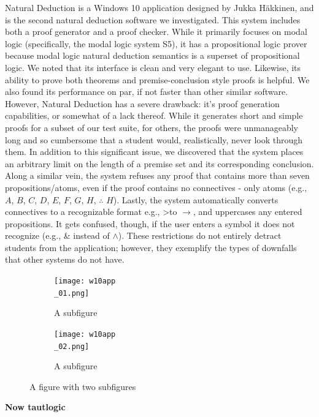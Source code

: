 \documentclass[ms]{uncgdissertationexp2}
\theoremstyle{plain}
\theoremstyle{definition}
\theoremstyle{remark}
\begin{document}
    Natural Deduction is a Windows 10 application designed by Jukka H\"akkinen, and is the second natural deduction software we investigated. This system includes both a proof generator and a proof checker. While it primarily focuses on modal logic (specifically, the modal logic system S5), it has a propositional logic prover because modal logic natural deduction semantics is a superset of propositional logic. We noted that its interface is clean and very elegant to use. Likewise, its ability to prove both theorems and premise-conclusion style proofs is helpful. We also found its performance on par, if not faster than other similar software. However, Natural Deduction has a severe drawback: it's proof generation capabilities, or somewhat of a lack thereof. While it generates short and simple proofs for a subset of our test suite, for others, the proofs were unmanageably long and so cumbersome that a student would, realistically, never look through them. In addition to this significant issue, we discovered that the system places an arbitrary limit on the length of a premise set and its corresponding conclusion. Along a similar vein, the system refuses any proof that contains more than seven propositions/atoms, even if the proof contains no connectives - only atoms (e.g., $A$, $B$, $C$, $D$, $E$, $F$, $G$, $H$, $\therefore$ $H$). Lastly, the system automatically converts connectives to a recognizable format e.g., \textgreater\;to $\to$, and uppercases any entered propositions. It gets confused, though, if the user enters a symbol it does not recognize (e.g., \& instead of $\land$). These restrictions do not entirely detract students from the application; however, they exemplify the types of downfalls that other systems do not have.
    \begin{figure}
        \centering
        \begin{subfigure}{.5\textwidth}
          \centering
          \texttt{[image: w10app\\\_01.png]}
          \caption{A subfigure}
          \label{fig:sub1}
        \end{subfigure}%
        \begin{subfigure}{.5\textwidth}
          \centering
          \texttt{[image: w10app\\\_02.png]}
          \caption{A subfigure}
          \label{fig:sub2}
        \end{subfigure}
        \caption{A figure with two subfigures}
        \label{fig:test}
    \end{figure}
    \textbf{Now tautlogic}
\end{document}
